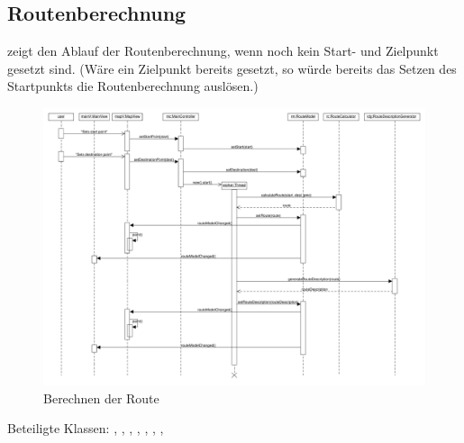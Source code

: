 \documentclass[a4paper, 11pt]{article}
\begin{document}
\subsection{Routenberechnung}
 zeigt den Ablauf der Routenberechnung, wenn noch kein Start- und Zielpunkt gesetzt sind.
(Wäre ein Zielpunkt bereits gesetzt, so würde bereits das Setzen des Startpunkts die Routenberechnung auslösen.)
\begin{figure}[H]
\centering
\includegraphics[angle=90, height=0.9\textheight]{RouteCalculationSequenz}
\caption{Berechnen der Route}
\label{fig:sequenz_routeCalculation}
\end{figure}
Beteiligte Klassen: , , , , , , , 
\end{document}
